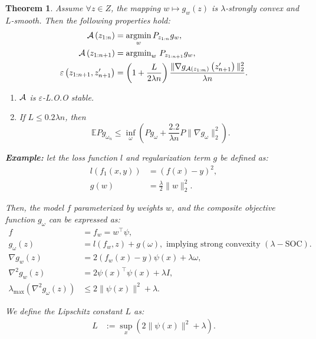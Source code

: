 \documentclass[twoside]{article}
\newcounter{lecnum}
\newtheorem{theorem}{Theorem}[lecnum]
\begin{document}
\begin{theorem}
Assume $\forall z \in Z$, the mapping $w \mapsto g_{w}(z)$ is $\lambda$-strongly convex and $L$-smooth. Then the following properties hold:
\begin{align}
    \mathcal{A} \left(z_{1: n}\right) &= \underset{w}{\operatorname{argmin}}\, P_{z_{1:n}} g_{w}, \\
    \mathcal{A} \left(z_{1: n+1}\right) &= \operatorname{argmin}_{w}\, P_{z_{1: n+1}} g_{w}, \\
    \varepsilon\left(z_{1: n+1}, z_{n+1}'\right) &= \left(1+\frac{L}{2\lambda n}\right) \frac{\|\nabla g_{\mathcal{A} \left(z_{1: m}\right)}\left(z_{n+1}'\right)\|_{2}^{2}}{\lambda n}.
\end{align}
\begin{enumerate}
    \item $\mathcal{A}$ is $\varepsilon$-L.O.O stable.
    \item If $L \leq 0.2 \lambda n$, then
    \begin{equation}
        \mathbb{E} P g_{\omega_{n}} \leq \inf_{\omega} \left(P g_{\omega} + \frac{2.2}{\lambda n} P\|\nabla g_{\omega}\|_{2}^{2}\right).
    \end{equation}
\end{enumerate}


\textbf{Example:} 
let the loss function $l$ and regularization term $g$ be defined as:
\begin{align*}
l\left(f_{1}(x, y)\right) &= (f(x)-y)^{2}, \\
g(w) &= \frac{\lambda}{2}\|w\|_{2}^{2}.
\end{align*}

Then, the model $f$ parameterized by weights $w$, and the composite objective function $g_{\omega}$ can be expressed as:
\begin{align*}
f &= f_{w} = w^{\top} \psi, \\
g_{\omega}(z) &= l\left(f_{w}, z\right) + g(\omega), \text{ implying strong convexity } (\lambda-\text{SOC}). \\
\nabla g_{w}(z) &= 2\left(f_{w}(x) - y\right) \psi(x) + \lambda \omega, \\
\nabla^{2} g_{w}(z) &= 2 \psi(x)^{\top} \psi(x) + \lambda I, \\
\lambda_{\max}\left(\nabla^{2} g_{\omega}(z)\right) &\leq 2\|\psi(x)\|^{2} + \lambda.
\end{align*}

We define the Lipschitz constant $L$ as:
\begin{align*}
L &:= \sup_{x} \left(2\|\psi(x)\|^{2} + \lambda\right).
\end{align*}


\end{theorem}
\end{document}
